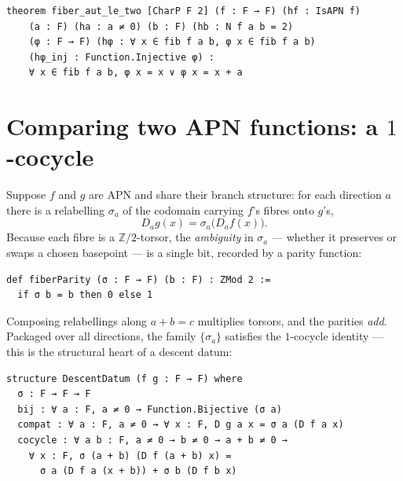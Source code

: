 \documentclass[11pt]{article}
\begin{document}
\begin{lstlisting}
theorem fiber_aut_le_two [CharP F 2] (f : F → F) (hf : IsAPN f)
    (a : F) (ha : a ≠ 0) (b : F) (hb : N f a b = 2)
    (φ : F → F) (hφ : ∀ x ∈ fib f a b, φ x ∈ fib f a b)
    (hφ_inj : Function.Injective φ) :
    ∀ x ∈ fib f a b, φ x = x ∨ φ x = x + a
\end{lstlisting}


\bigskip

\section{Comparing two APN functions: a $1$-cocycle}

\noindent
Suppose $f$ and $g$ are APN and share their branch structure: for each direction
$a$ there is a relabelling $\sigma_a$ of the codomain carrying $f$'s fibres onto
$g$'s,
\[
  D_a g(x) = \sigma_a\bigl(D_a f(x)\bigr).
\]
Because each fibre is a $\mathbb{Z}/2$-torsor, the \emph{ambiguity} in
$\sigma_a$ --- whether it preserves or swaps a chosen basepoint --- is a single
bit, recorded by a parity function:

\begin{lstlisting}
def fiberParity (σ : F → F) (b : F) : ZMod 2 :=
  if σ b = b then 0 else 1
\end{lstlisting}

\noindent
Composing relabellings along $a+b=c$ multiplies torsors, and the parities
\emph{add}. Packaged over all directions, the family $\{\sigma_a\}$ satisfies the
$1$-cocycle identity --- this is the structural heart of a descent datum:

\begin{lstlisting}
structure DescentDatum (f g : F → F) where
  σ : F → F → F
  bij : ∀ a : F, a ≠ 0 → Function.Bijective (σ a)
  compat : ∀ a : F, a ≠ 0 → ∀ x : F, D g a x = σ a (D f a x)
  cocycle : ∀ a b : F, a ≠ 0 → b ≠ 0 → a + b ≠ 0 →
    ∀ x : F, σ (a + b) (D f (a + b) x) =
      σ a (D f a (x + b)) + σ b (D f b x)
\end{lstlisting}
\end{document}
